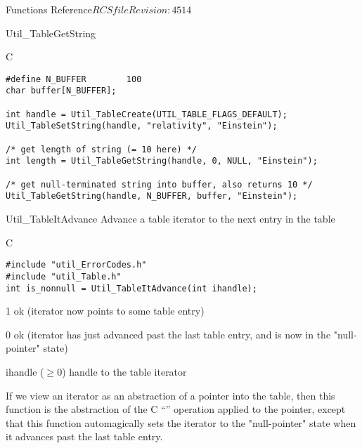 \begin{cactuspart}{ Functions Reference}{$RCSfile$}{$Revision: 4514 $}
\begin{FunctionDescription}{Util\_TableGetString}
\begin{ExampleSection}
\begin{Example}{C}
\begin{verbatim}
#define N_BUFFER        100
char buffer[N_BUFFER];

int handle = Util_TableCreate(UTIL_TABLE_FLAGS_DEFAULT);
Util_TableSetString(handle, "relativity", "Einstein");

/* get length of string (= 10 here) */
int length = Util_TableGetString(handle, 0, NULL, "Einstein");

/* get null-terminated string into buffer, also returns 10 */
Util_TableGetString(handle, N_BUFFER, buffer, "Einstein");
\end{verbatim}
\end{Example}
\end{ExampleSection}
\end{FunctionDescription}


\begin{FunctionDescription}{Util\_TableItAdvance}
\label{Util-TableItAdvance}
Advance a table iterator to the next entry in the table

\begin{SynopsisSection}
\begin{Synopsis}{C}
\begin{verbatim}
#include "util_ErrorCodes.h"
#include "util_Table.h"
int is_nonnull = Util_TableItAdvance(int ihandle);
\end{verbatim}
\end{Synopsis}
\end{SynopsisSection}

\begin{ResultSection}
\begin{Result}{\rm 1}
ok (iterator now points to some table entry)
\end{Result}
\begin{Result}{\rm 0}
ok (iterator has just advanced past the last table entry,
    and is now in the "null-pointer" state)
\end{Result}
\end{ResultSection}

\begin{ParameterSection}
\begin{Parameter}{ihandle ($\ge 0$)}
handle to the table iterator
\end{Parameter}
\end{ParameterSection}

\begin{Discussion}
If we view an iterator as an abstraction of a pointer into the table,
then this function is the abstraction of the C ``\code{++}'' operation
applied to the pointer, except that this function automagically sets
the iterator to the "null-pointer" state when it advances past the
last table entry.


\end{Discussion}
\end{FunctionDescription}
\end{cactuspart}
